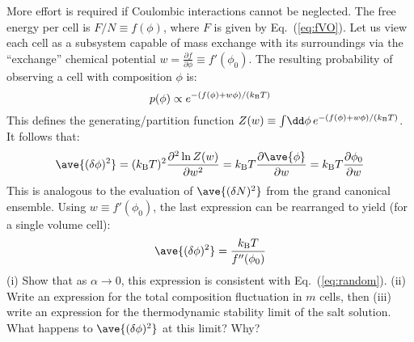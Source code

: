 \smallskip \subp
More effort is required if Coulombic interactions
cannot be neglected.
The free energy per cell is $F/N \equiv f(\phi)$,
where $F$ is given by Eq.~(\ref{eq:fVO}).
Let us view each cell as a subsystem 
capable of mass exchange with its surroundings
via the ``exchange'' chemical potential
$w = \frac{\partial f}{\partial \phi} \equiv f'(\phi_0)$.
The resulting probability of observing a cell with composition $\phi$ is:
\[ p(\phi) \propto e^{- (f(\phi) + w \phi)/(k_{\rm B} T) } \]
This defines the generating/partition function 
$Z(w) \equiv \int\!\dd\phi\,e^{- (f(\phi) + w \phi)/(k_{\rm B} T) }$.
It follows that:
\[ \ave{(\delta \phi)^2} = (k_{\rm B}T)^2 \frac{\partial^2 \ln Z(w)}{\partial w^2}
= k_{\rm B} T \frac{\partial \ave{\phi}}{\partial w}
= k_{\rm B} T \frac{\partial \phi_0}{\partial w} \]
This is analogous to the evaluation of $\ave{(\delta N)^2}$ from
the grand canonical ensemble.
Using $w \equiv f'(\phi_0)$, the last expression can be rearranged to yield
(for a single volume cell):
\[ \ave{(\delta \phi)^2} = \frac{k_{\rm B} T}{f''(\phi_0)} \]
(i) Show that as $\alpha \rightarrow 0$,
this expression is consistent with Eq.~(\ref{eq:random}).
(ii) Write an expression for the total composition fluctuation
in $m$ cells, then
(iii) write an expression for the thermodynamic stability limit
of the salt solution. What happens to $\ave{(\delta \phi)^2}$
at this limit? Why?
